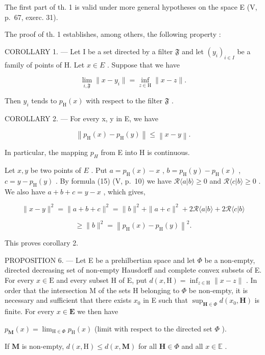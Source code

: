 The first part of th. 1 is valid under more general hypotheses on the space E (V, p.~67, exerc. 31).

The proof of th. 1 establishes, among others, the following property :

COROLLARY 1. --- Let I be a set directed by a filter \(\mathfrak{F}\) and let \((y_i)_{i\in I}\) be a family of points of H. Let \(x\in E\) . Suppose that we have

\[
\lim _ {i, \mathfrak {F}} \| x - y _ {i} \| = \inf _ {z \in \mathrm{H}} \| x - z \|.
\]

Then \(y_{i}\) tends to \(p_{\mathrm{H}}(x)\) with respect to the filter \(\mathfrak{F}\) .

COROLLARY 2. --- For every x, y in E, we have

\[
\left\| p _ {\mathrm{H}} (x) - p _ {\mathrm{H}} (y) \right\| \leqslant \left\| x - y \right\|.
\]

In particular, the mapping \(p_{H}\) from E into H is continuous.

Let \(x, y\) be two points of \(E\) . Put \(a = p_{\mathrm{H}}(x) - x\) , \(b = p_{\mathrm{H}}(y) - p_{\mathrm{H}}(x)\) , \(c = y - p_{\mathrm{H}}(y)\) . By formula (15) (V, p.~10) we have \(\mathcal{R}\langle a|b\rangle \geqslant 0\) and \(\mathcal{R}\langle c|b\rangle \geqslant 0\) . We also have \(a + b + c = y - x\) , which gives,

\[
\| x - y \| ^ {2} = \| a + b + c \| ^ {2} = \| b \| ^ {2} + \| a + c \| ^ {2} + 2 \mathscr {R} \langle a | b \rangle + 2 \mathscr {R} \langle c | b \rangle
\]

\[
\geqslant \| b \| ^ {2} = \left\| p _ {\mathrm{H}} (x) - p _ {\mathrm{H}} (y) \right\| ^ {2}.
\]

This proves corollary 2.

PROPOSITION 6. --- Let E be a prehilbertian space and let \(\Phi\) be a non-empty, directed decreasing set of non-empty Hausdorff and complete convex subsets of E. For every \(x \in \mathrm{E}\) and every subset H of E, put \(d(x, \mathrm{H}) = \inf_{z \in \mathrm{H}} \| x - z \|\) . In order that the intersection M of the sets H belonging to \(\Phi\) be non-empty, it is necessary and sufficient that there exists \(x_0\) in E such that \(\sup_{\mathbf{H} \in \Phi} d(x_0, \mathbf{H})\) is finite. For every \(x \in \mathbf{E}\) we then have

\(p_{\mathbf{M}}(x) = \lim_{\mathrm{H}\in \Phi}p_{\mathrm{H}}(x)\) (limit with respect to the directed set \(\Phi\) ).

If \(\mathbf{M}\) is non-empty, \(d(x,\mathrm{H})\leqslant d(x,\mathbf{M})\) for all \(\mathbf{H}\in \Phi\) and all \(x\in \mathbb{E}\) .

